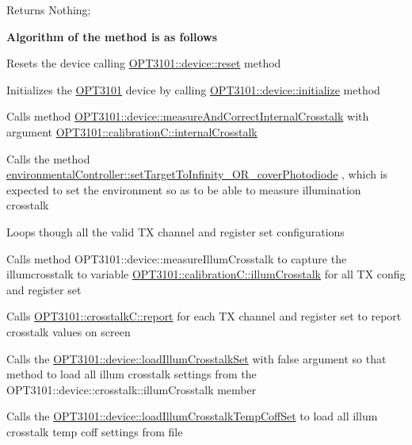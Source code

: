 \begin{DoxyReturn}{Returns}
Nothing; 
\end{DoxyReturn}
{\bfseries Algorithm of the method is as follows}


\begin{DoxyItemize}
\item Resets the device calling \mbox{\hyperlink{class_o_p_t3101_1_1device_a1d37b22f535d8130c7f24799f7fa3c33}{O\+P\+T3101\+::device\+::reset}} method
\item Initializes the \mbox{\hyperlink{namespace_o_p_t3101}{O\+P\+T3101}} device by calling \mbox{\hyperlink{class_o_p_t3101_1_1device_ae3b7fb4f9a8f1dee330523e034aa9460}{O\+P\+T3101\+::device\+::initialize}} method
\item Calls method \mbox{\hyperlink{class_o_p_t3101_1_1device_a44f832d6edbfb26db079ddba4debfdba}{O\+P\+T3101\+::device\+::measure\+And\+Correct\+Internal\+Crosstalk}} with argument \mbox{\hyperlink{class_o_p_t3101_1_1calibration_c_a4df5b876541e9b33eadf6290fe08b7e5}{O\+P\+T3101\+::calibration\+C\+::internal\+Crosstalk}}
\item Calls the method \mbox{\hyperlink{classenvironmental_controller_a8a1fb44efff232844f00de18e174d4ce}{environmental\+Controller\+::set\+Target\+To\+Infinity\+\_\+\+O\+R\+\_\+cover\+Photodiode}} , which is expected to set the environment so as to be able to measure illumination crosstalk
\item Loops though all the valid TX channel and register set configurations
\item Calls method O\+P\+T3101\+::device\+::measure\+Illum\+Crosstalk to capture the illumcrosstalk to variable \mbox{\hyperlink{class_o_p_t3101_1_1calibration_c_ac09121c7057093506de63d6e2ea3a4b7}{O\+P\+T3101\+::calibration\+C\+::illum\+Crosstalk}} for all TX config and register set
\item Calls \mbox{\hyperlink{class_o_p_t3101_1_1crosstalk_c_a8a611602b13d6f3e97049696ddebe209}{O\+P\+T3101\+::crosstalk\+C\+::report}} for each TX channel and register set to report crosstalk values on screen
\item Calls the \mbox{\hyperlink{class_o_p_t3101_1_1device_a48b320dfe4376bf62043d10ba937e8cd}{O\+P\+T3101\+::device\+::load\+Illum\+Crosstalk\+Set}} with false argument so that method to load all illum crosstalk settings from the O\+P\+T3101\+::device\+::crosstalk\+::illum\+Crosstalk member
\item Calls the \mbox{\hyperlink{class_o_p_t3101_1_1device_ab384cacd80cd32643b7029fe59428e92}{O\+P\+T3101\+::device\+::load\+Illum\+Crosstalk\+Temp\+Coff\+Set}} to load all illum crosstalk temp coff settings from file

\end{DoxyItemize}
